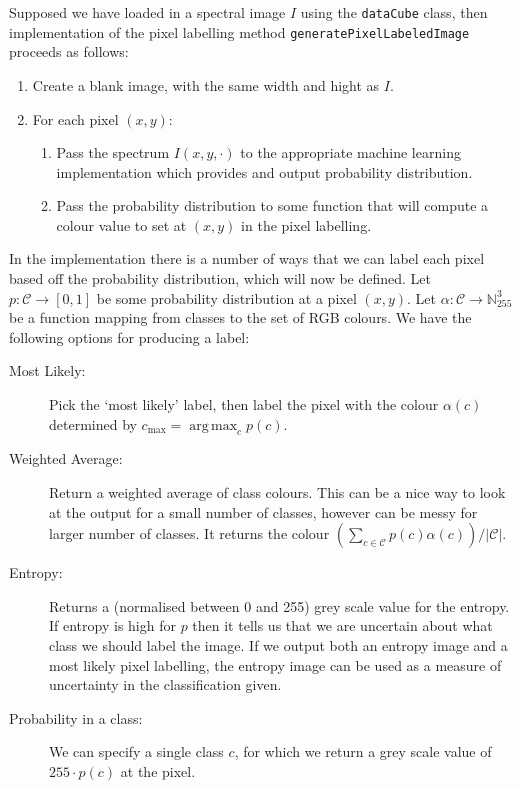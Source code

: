 \documentclass[12pt,twoside,notitlepage]{report}
\newcommand{\cl}[1]{\mathcal{#1}}
\newcommand{\bb}[1]{\mathbb{#1}}
\DeclareMathOperator*{\argmax}{arg\,max}
\begin{document}
        Supposed we have loaded in a spectral image $I$ using the \texttt{dataCube} class, then implementation of the 
        pixel labelling method \texttt{generatePixelLabeledImage} proceeds as follows:
        \begin{enumerate}
            \item 
                Create a blank image, with the same width and hight as $I$.
            \item 
                For each pixel $(x,y)$:

                \renewcommand{\labelenumii}{\theenumi.\arabic{enumii}.}
                \begin{enumerate}
                    \item 
                        Pass the spectrum $I(x,y,\cdot)$ to the appropriate machine learning implementation which provides 
                        and output probability distribution.
                    \item 
                        Pass the probability distribution to some function that will compute a colour value to set at $(x,y)$ in the pixel labelling.
                \end{enumerate}
                \renewcommand{\labelenumii}{(\alph{enumii})}

        \end{enumerate}

        In the implementation there is a number of ways that we can label each pixel based off the probability 
        distribution, which will now be defined. Let $p:\cl{C}\rightarrow [0,1]$ be some probability distribution at a 
        pixel $(x,y)$. Let $\alpha:\cl{C}\rightarrow \bb{N}_{255}^3$ be a function mapping from classes to the set of RGB 
        colours. We have the following options for producing a label:
        \begin{description}
            \item[Most Likely:]
                Pick the `most likely' label, then label the pixel with the colour $\alpha(c)$ determined by $c_{\text{max}} = \argmax_c p(c)$.
            \item[Weighted Average:]
                 Return a weighted average of class colours. This can be a nice way to look at the output for a small number of classes, however can be messy for larger number of classes. It returns the colour $(\sum_{c\in\cl{C}} p(c)\alpha(c))/|\cl{C}|$.
            \item[Entropy:]
                 Returns a (normalised between 0 and 255) grey scale value for the entropy. If entropy is high for $p$ then it tells us that we are uncertain about what class we should label the image. If we output both an entropy image and a most likely pixel labelling, the entropy image can be used as a measure of uncertainty in the classification given.
            \item[Probability in a class:]
                  We can specify a single class $c$, for which we return a grey scale value of $255 \cdot p(c)$ at the pixel. 
        \end{description}
\end{document}
